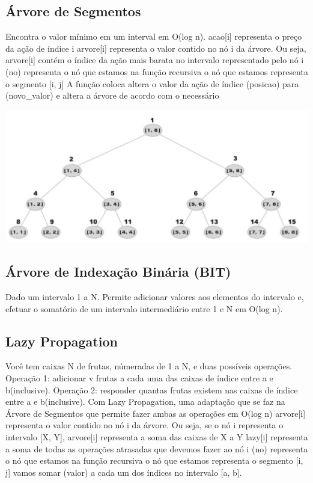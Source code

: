 \documentclass[a4paper,12pt]{article}
\begin{document}
\subsection{Árvore de Segmentos}
\indent Encontra o valor mínimo em um interval em O(log n).
acao[i] representa o preço da ação de índice i
arvore[i] representa o valor contido no nó i da árvore.
\newline Ou seja, arvore[i] contém o índice da ação mais barata
no intervalo representado pelo nó i
(no) representa o nó que estamos na função recursiva o nó que estamos representa o segmento [i, j]
\newline A função coloca altera o valor da ação de índice (posicao) para (novo\_valor) e altera a árvore de acordo com o necessário
\begin{center}
  \includegraphics[width=\linewidth]{figures/estruturas/arvore_de_segmentos.png}
\end{center}

\subsection{Árvore de Indexação Binária (BIT)}
\indent Dado um intervalo 1 a N. Permite adicionar valores aos elementos do intervalo e, efetuar o somatório de um intervalo intermediário entre 1 e N em O(log n).

\subsection{Lazy Propagation}
\indent Você tem caixas N de frutas, númeradas de 1 a N, e duas possíveis operações.
\newline Operação 1: adicionar v frutas a cada uma das caixas de índice entre a e b(inclusive).
\newline Operação 2: responder quantas frutas existem nas caixas de índice entre a e b(inclusive).
\newline Com Lazy Propagation, uma adaptação que se faz na Árvore de Segmentos que permite fazer ambas as operações em O(log n) arvore[i] representa o valor contido no nó i da árvore.
\newline Ou seja, se o nó i representa o intervalo [X, Y], arvore[i] representa a soma das caixas de X a Y lazy[i] representa a soma de todas as operações atrasadas que devemos fazer ao nó i (no) representa o nó que estamos na função recursiva o nó que estamos representa o segmento [i, j] vamos somar (valor) a cada um dos índices no intervalo [a, b].
\end{document}
